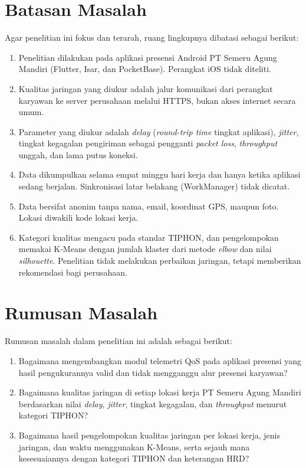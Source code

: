 \section{Batasan Masalah}
Agar penelitian ini fokus dan terarah, ruang lingkupnya dibatasi sebagai berikut:
\begin{enumerate}
    \item Penelitian dilakukan pada aplikasi presensi Android PT Semeru Agung Mandiri (Flutter, Isar, dan PocketBase). Perangkat iOS tidak diteliti.
    \item Kualitas jaringan yang diukur adalah jalur komunikasi dari perangkat karyawan ke server perusahaan melalui HTTPS, bukan akses internet secara umum.
    \item Parameter yang diukur adalah \textit{delay} (\textit{round-trip time} tingkat aplikasi), \textit{jitter}, tingkat kegagalan pengiriman sebagai pengganti \textit{packet loss}, \textit{throughput} unggah, dan lama putus koneksi.
    \item Data dikumpulkan selama empat minggu hari kerja dan hanya ketika aplikasi sedang berjalan. Sinkronisasi latar belakang (WorkManager) tidak dicatat.
    \item Data bersifat anonim tanpa nama, email, koordinat GPS, maupun foto. Lokasi diwakili kode lokasi kerja.
    \item Kategori kualitas mengacu pada standar TIPHON, dan pengelompokan memakai K-Means dengan jumlah klaster dari metode \textit{elbow} dan nilai \textit{silhouette}. Penelitian tidak melakukan perbaikan jaringan, tetapi memberikan rekomendasi bagi perusahaan.
\end{enumerate}

\section{Rumusan Masalah}
Rumusan masalah dalam penelitian ini adalah sebagai berikut:
\begin{enumerate}
    \item Bagaimana mengembangkan modul telemetri QoS pada aplikasi presensi yang hasil pengukurannya valid dan tidak mengganggu alur presensi karyawan?
    \item Bagaimana kualitas jaringan di setiap lokasi kerja PT Semeru Agung Mandiri berdasarkan nilai \textit{delay}, \textit{jitter}, tingkat kegagalan, dan \textit{throughput} menurut kategori TIPHON?
    \item Bagaimana hasil pengelompokan kualitas jaringan per lokasi kerja, jenis jaringan, dan waktu menggunakan K-Means, serta sejauh mana kesesuaiannya dengan kategori TIPHON dan keterangan HRD?
\end{enumerate}

